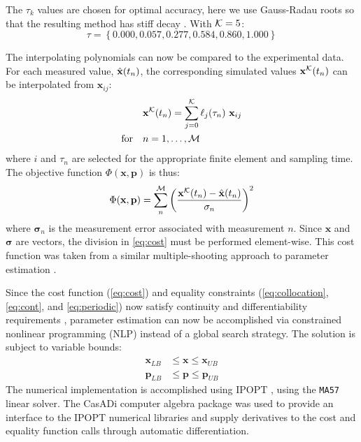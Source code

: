 The $\tau_k$ values are chosen for optimal accuracy, here we use Gauss-Radau
roots so that the resulting method has stiff decay \cite{Biegler2010}. With
${\cal K} = 5$: $$ \tau = \left\{0.000, 0.057, 0.277, 0.584, 0.860,
1.000\right\} $$

The interpolating polynomials can now be compared to the experimental data.
For each measured value, $\hat{\mathbf{x}}(t_n)$, the corresponding simulated values
${\mathbf{x}}^{\cal K}(t_n)$ can be interpolated from ${\bm x}_{ij}$:
\begin{equation}
  \begin{aligned} &{\mathbf{x}}^{\cal K}(t_n) = \sum^{\cal K}_{j=0} \ell_j(\tau_n) \
    {\mathbf{x}}_{ij} \\
    \textrm{for}\quad &n = 1,\ldots,{\cal M}
  \end{aligned}
\end{equation}
where $i$ and $\tau_n$ are selected for the appropriate finite
element and sampling time. The objective function $\Phi({\bm x},{\bm p})$ is thus:
\begin{equation} \label{eq:cost}
  \Phi({\mathbf{x}},{\mathbf{p}}) = \sum_n^{\cal M} \left(\frac{{\mathbf{x}}^{\cal K}(t_n) -
\hat{\mathbf{x}}(t_n)}{{\mathbf{\sigma}}_n}\right)^2
\end{equation}
where ${\bm \sigma}_{n}$ is the measurement error associated with measurement
$n$. Since ${\bm x}$ and $\bm\sigma$ are vectors, the division in \ref{eq:cost} must be performed element-wise. This cost function was taken from a similar multiple-shooting approach to parameter estimation \cite{Bock2007}. 

Since the cost function (\ref{eq:cost}) and equality constraints
(\ref{eq:collocation}, \ref{eq:cont}, and \ref{eq:periodic}) now satisfy
continuity and differentiability requirements \cite{Floudas1995}, parameter
estimation can now be accomplished via constrained nonlinear programming (NLP)
instead of a global search strategy. The solution is subject to variable
bounds:
\begin{equation}
  \begin{aligned} {\bm x}_{LB} &\le {\bm x} \le {\bm x}_{UB} \\ {\bm p}_{LB}
    &\le {\bm p} \le {\bm p}_{UB}
  \label{eq:bounds}
\end{aligned}
\end{equation} The numerical implementation is accomplished using IPOPT
\cite{Wachter2005}, using the \texttt{MA57} \cite{HSL2011} linear solver. The
CasADi computer algebra package \cite{Andersson2012} was used to provide an
interface to the IPOPT numerical libraries and supply derivatives to the cost
and equality function calls through automatic differentiation.

